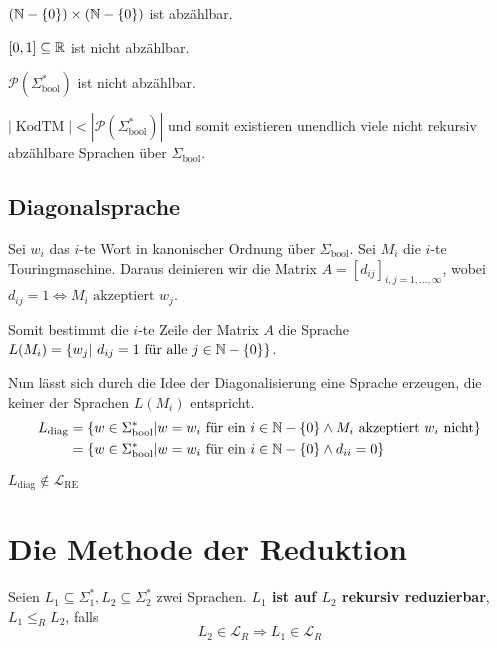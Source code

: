 \begin{lemma}
\( (\mathbb{N} - \{0\}) \times (\mathbb{N} - \{0\}) \) ist abzählbar.\\
\end{lemma}

\begin{satz}
\( [0, 1] \subseteq \mathbb{R} \) ist nicht abzählbar.\\
\end{satz}

\begin{satz}
\( \mathcal{P}(\Sigma_\text{bool}^*) \) ist nicht abzählbar.\\
\end{satz}

\begin{corollary}
\( |\operatorname{KodTM}| < |\mathcal{P}(\Sigma_\text{bool}^*)| \) und somit existieren unendlich viele nicht rekursiv abzählbare Sprachen über \( \Sigma_\text{bool} \).
\end{corollary}

\subsection{Diagonalsprache}
Sei \( w_i \) das \(i\)-te Wort in kanonischer Ordnung über \( \Sigma_\text{bool} \). Sei \(M_i\) die \(i\)-te Touringmaschine. Daraus deinieren wir die Matrix \( A = [d_{ij}]_{i,j = 1, \ldots, \infty} \), wobei \( d_{ij} = 1 \Leftrightarrow M_i \text{ akzeptiert } w_j \).

Somit bestimmt die \(i\)-te Zeile der Matrix \(A\) die Sprache \( L(M_i) = \{w_j |\ d_{ij} = 1 \text{ für alle } j \in \mathbb{N} - \{0\}\} \).

Nun lässt sich durch die Idee der Diagonalisierung eine Sprache erzeugen, die keiner der Sprachen \(L(M_i)\) entspricht.
\begin{align*}
L_\text{diag} &= \{ w \in \Sigma_\text{bool}^* | w = w_i \text{ für ein } i \in \mathbb{N} - \{0\} \land M_i \text{ akzeptiert } w_i \text{ nicht} \}\\
&= \{ w \in \Sigma_\text{bool}^* | w = w_i \text{ für ein } i \in \mathbb{N} - \{0\} \land d_{ii} = 0 \}
\end{align*}

\begin{satz}
\( L_\text{diag} \notin \mathcal{L}_\text{RE} \)
\end{satz}

\section{Die Methode der Reduktion}
\begin{definition}
Seien \(L_1 \subseteq \Sigma_1^*, L_2 \subseteq \Sigma_2^*\) zwei Sprachen. \textbf{\( L_1 \) ist auf \( L_2 \) rekursiv reduzierbar}, \( L_1 \leq_R L_2 \), falls \[ L_2 \in \mathcal{L}_R \Rightarrow L_1 \in \mathcal{L}_R \]
\end{definition}

